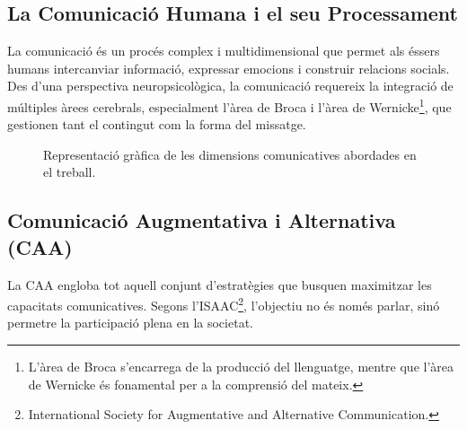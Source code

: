 
\subsection{La Comunicació Humana i el seu Processament}
La comunicació és un procés complex i multidimensional que permet als éssers humans intercanviar informació, expressar emocions i construir relacions socials. Des d'una perspectiva neuropsicològica, la comunicació requereix la integració de múltiples àrees cerebrals, especialment l'àrea de Broca i l'àrea de Wernicke\footnote{L'àrea de Broca s'encarrega de la producció del llenguatge, mentre que l'àrea de Wernicke és fonamental per a la comprensió del mateix.}, que gestionen tant el contingut com la forma del missatge.

\begin{figure}[ht]
    \centering
    \caption{Representació gràfica de les dimensions comunicatives abordades en el treball.}
\end{figure}

\newpage
\subsection{Comunicació Augmentativa i Alternativa (CAA)}
\begin{tcolorbox}[colback=TealBlue!5, colframe=TealBlue, arc=5pt, title=La CAA com a eina d'inclusió, fonttitle=\bfseries, shadow={2pt}{-2pt}{0pt}{black!10}]
    La CAA engloba tot aquell conjunt d'estratègies que busquen maximitzar les capacitats comunicatives. Segons l'ISAAC\footnote{International Society for Augmentative and Alternative Communication.}, l'objectiu no és només parlar, sinó permetre la participació plena en la societat.
\end{tcolorbox}

